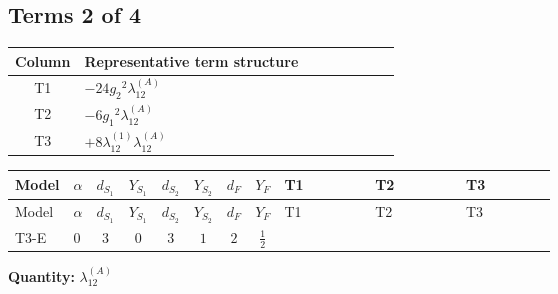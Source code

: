 \documentclass[8pt]{article}
\begin{document}
\begin{landscape}
\subsection*{Terms 2 of 4}
\begin{center}
\begin{tabular}{@{}c >{\raggedright\arraybackslash}p{0.82\linewidth}@{}}
\toprule
Column & Representative term structure \\
\midrule
T1 & \(\displaystyle -24 {g_2}^2 {\lambda_{12}^{(A)}}\) \\
\midrule
T2 & \(\displaystyle -6 {g_1}^2 {\lambda_{12}^{(A)}}\) \\
\midrule
T3 & \(\displaystyle +8 {\lambda_{12}^{(1)}} {\lambda_{12}^{(A)}}\) \\
\midrule
\bottomrule
\end{tabular}
\end{center}
\smallskip
\tiny
\begin{longtable}{@{}llcccccc >{\raggedright\arraybackslash}p{0.21\linewidth} >{\raggedright\arraybackslash}p{0.21\linewidth} >{\raggedright\arraybackslash}p{0.21\linewidth}@{}}
\toprule
Model & $\alpha$ & $d_{S_1}$ & $Y_{S_1}$ & $d_{S_2}$ & $Y_{S_2}$ & $d_F$ & $Y_F$ & T1 & T2 & T3 \\
\midrule
\endfirsthead
\toprule
Model & $\alpha$ & $d_{S_1}$ & $Y_{S_1}$ & $d_{S_2}$ & $Y_{S_2}$ & $d_F$ & $Y_F$ & T1 & T2 & T3 \\
\midrule
\endhead
T3-E & $0$ & $3$ & $0$ & $3$ & $1$ & $2$ & $\frac{1}{2}$ & \scriptsize\adjustbox{max width=\linewidth}{$\begin{gathered} -24 {g_2}^2 {\lambda_{12}^{(A)}}\end{gathered}$} & \scriptsize\adjustbox{max width=\linewidth}{$\begin{gathered} -6 {g_1}^2 {\lambda_{12}^{(A)}}\end{gathered}$} & \scriptsize\adjustbox{max width=\linewidth}{$\begin{gathered} +8 {\lambda_{12}^{(1)}} {\lambda_{12}^{(A)}}\end{gathered}$} \\
\midrule
\bottomrule
\end{longtable}
\clearpage
\noindent\textbf{Quantity: }$\lambda_{12}^{(A)}$\par\smallskip

\end{landscape}
\end{document}

